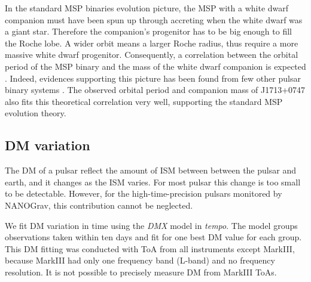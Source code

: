 In the standard MSP binaries evolution picture, the MSP with a white dwarf companion must have been spun up through
accreting when the white dwarf was a giant star. Therefore the 
companion's progenitor has to be big enough to fill the Roche lobe. A wider
orbit means a larger Roche radius, thus require a more massive white dwarf 
progenitor.
Consequently, a correlation between the orbital period
of the MSP binary and the mass of the white dwarf companion is expected \citep{rpj+95, ts99a, prp02b, th14}. 
Indeed, evidences supporting this picture has been found from few other pulsar
binary systems \citep{vbb+01, ktr94}.  
The observed  orbital period and companion mass of J1713+0747 also fits this theoretical correlation very well, supporting the standard MSP evolution theory. %




\subsection{DM variation}
\label{sec:dmx}
The DM of a pulsar reflect the amount of ISM between
between the pulsar and earth, and it changes as the ISM varies. For most pulsar
this change is too small to be detectable. However, for the
high-time-precision pulsars monitored by NANOGrav, this contribution cannot be 
neglected.

We fit DM variation in time using the {\it DMX} model in {\it tempo}.
The model groups observations taken within ten days and fit for one
best DM value for each group.   
This DM fitting was conducted with ToA from all instruments except MarkIII,
because MarkIII had only one frequency band (L-band) and no frequency
resolution. It is not possible to precisely measure DM from MarkIII ToAs.

